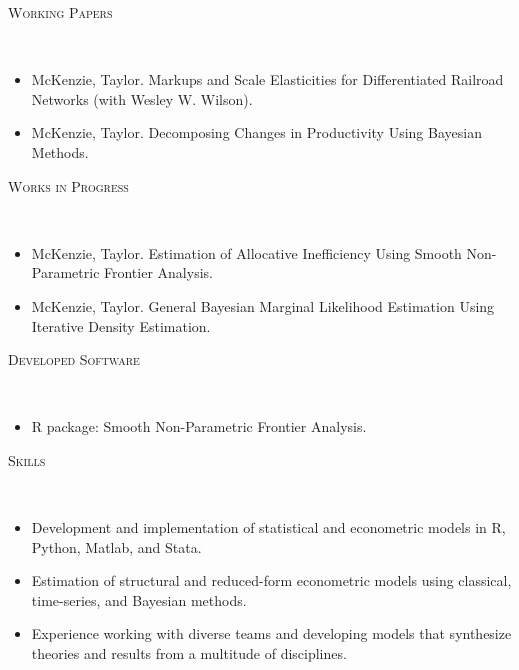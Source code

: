 \documentclass[11pt]{article}
\newenvironment{changemargin}[2]{%
  \begin{list}{}{%
    \setlength{\topsep}{0pt}%
    \setlength{\leftmargin}{#1}%
    \setlength{\rightmargin}{#2}%
    \setlength{\listparindent}{\parindent}%
    \setlength{\itemindent}{\parindent}%
    \setlength{\parsep}{\parskip}%
  }%
  \item[]}{\end{list}
}
\newcommand{\lineover}{
	\begin{changemargin}{-0.05in}{-0.05in}
		\vspace*{-8pt}
		\hrulefill \\
		\vspace*{-2pt}
	\end{changemargin}
}
\newcommand{\header}[1]{
	\begin{changemargin}{-0.5in}{-0.5in}
		\scshape{#1}\\
  	\lineover
	\end{changemargin}
}
\newenvironment{body} {
	\vspace*{-16pt}
	\begin{changemargin}{-0.25in}{-0.5in}
  }	
	{\end{changemargin}
}
\begin{document}
\smallskip
\header{Working Papers}

\begin{body}
\vspace{14pt}
\begin{itemize}
	\item McKenzie, Taylor. Markups and Scale Elasticities for Differentiated Railroad Networks (with Wesley W. Wilson).
	\item McKenzie, Taylor. Decomposing Changes in Productivity Using Bayesian Methods.
\end{itemize}
\end{body}

\smallskip
\header{Works in Progress}

\begin{body}
	\vspace{14pt}
	\begin{itemize}
		\item McKenzie, Taylor. Estimation of Allocative Inefficiency Using Smooth Non-Parametric Frontier Analysis.
		\item McKenzie, Taylor. General Bayesian Marginal Likelihood Estimation Using Iterative Density Estimation.
	\end{itemize}
\end{body}

\smallskip
\header{Developed Software}
\begin{body}
	\vspace{14pt}
	\begin{itemize}
		\item R package: Smooth Non-Parametric Frontier Analysis.
	\end{itemize}
\end{body}


\smallskip
\header{Skills}

\begin{body}
\vspace{14pt}
\begin{itemize}
	\item Development and implementation of statistical and econometric models in R, Python, Matlab, and Stata.
	\item Estimation of structural and reduced-form econometric models using classical, time-series, and Bayesian methods.
	\item Experience working with diverse teams and developing models that synthesize theories and results from a multitude of disciplines.
\end{itemize}
\end{body}
\end{document}
